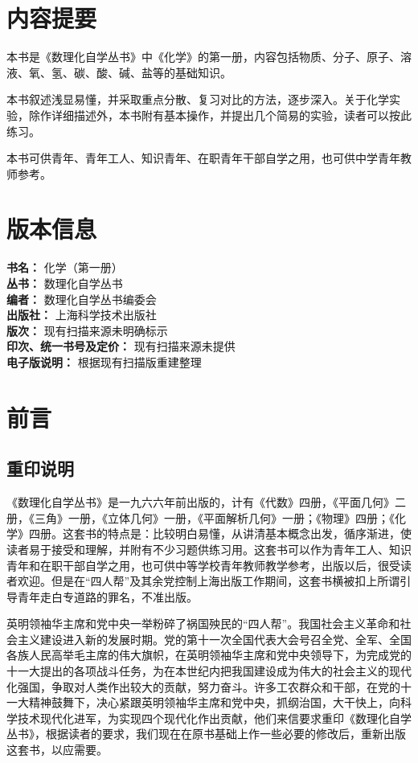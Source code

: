\chapter*{内容提要}

本书是《数理化自学丛书》中《化学》的第一册，内容包括物质、分子、原子、溶液、氧、氢、碳、酸、碱、盐等的基础知识。

本书叙述浅显易懂，并采取重点分散、复习对比的方法，逐步深入。关于化学实验，除作详细描述外，本书附有基本操作，并提出几个简易的实验，读者可以按此练习。

本书可供青年、青年工人、知识青年、在职青年干部自学之用，也可供中学青年教师参考。

\chapter*{版本信息}

\begin{flushleft}
\textbf{书名：} 化学（第一册）\\
\textbf{丛书：} 数理化自学丛书\\
\textbf{编者：} 数理化自学丛书编委会\\
\textbf{出版社：} 上海科学技术出版社\\
\textbf{版次：} 现有扫描来源未明确标示\\
\textbf{印次、统一书号及定价：} 现有扫描来源未提供\\
\textbf{电子版说明：} 根据现有扫描版重建整理
\end{flushleft}

\chapter{前言}

\section{重印说明}

《数理化自学丛书》是一九六六年前出版的，计有《代数》四册，《平面几何》二册，《三角》一册，《立体几何》一册，《平面解析几何》一册；《物理》四册；《化学》四册。这套书的特点是：比较明白易懂，从讲清基本概念出发，循序渐进，使读者易于接受和理解，并附有不少习题供练习用。这套书可以作为青年工人、知识青年和在职干部自学之用，也可供中等学校青年教师教学参考，出版以后，很受读者欢迎。但是在``四人帮''及其余党控制上海出版工作期间，这套书横被扣上所谓引导青年走白专道路的罪名，不准出版。

英明领袖华主席和党中央一举粉碎了祸国殃民的``四人帮''。我国社会主义革命和社会主义建设进入新的发展时期。党的第十一次全国代表大会号召全党、全军、全国各族人民高举毛主席的伟大旗帜，在英明领袖华主席和党中央领导下，为完成党的十一大提出的各项战斗任务，为在本世纪内把我国建设成为伟大的社会主义的现代化强国，争取对人类作出较大的贡献，努力奋斗。许多工农群众和干部，在党的十一大精神鼓舞下，决心紧跟英明领袖华主席和党中央，抓纲治国，大干快上，向科学技术现代化进军，为实现四个现代化作出贡献，他们来信要求重印《数理化自学丛书》，根据读者的要求，我们现在在原书基础上作一些必要的修改后，重新出版这套书，以应需要。

